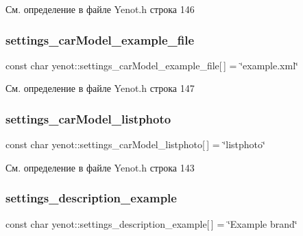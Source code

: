 См. определение в файле Yenot.\+h строка 146

\mbox{\label{namespaceyenot_acd910e59eb17aa18802af8f4544aab48}} 
\subsubsection{\texorpdfstring{settings\+\_\+car\+Model\+\_\+example\+\_\+file}{settings\_carModel\_example\_file}}
{\footnotesize\ttfamily const char yenot\+::settings\+\_\+car\+Model\+\_\+example\+\_\+file\mbox{[}$\,$\mbox{]} = \char`\"{}example.\+xml\char`\"{}}



См. определение в файле Yenot.\+h строка 147

\mbox{\label{namespaceyenot_a0a2414e62514c20e76cf0c522ebf38a3}} 
\subsubsection{\texorpdfstring{settings\+\_\+car\+Model\+\_\+listphoto}{settings\_carModel\_listphoto}}
{\footnotesize\ttfamily const char yenot\+::settings\+\_\+car\+Model\+\_\+listphoto\mbox{[}$\,$\mbox{]} = \char`\"{}listphoto\char`\"{}}



См. определение в файле Yenot.\+h строка 143

\mbox{\label{namespaceyenot_a37f90b0081fe0617055470d46489ea0f}} 
\subsubsection{\texorpdfstring{settings\+\_\+description\+\_\+example}{settings\_description\_example}}
{\footnotesize\ttfamily const char yenot\+::settings\+\_\+description\+\_\+example\mbox{[}$\,$\mbox{]} = \char`\"{}Example brand\char`\"{}}



